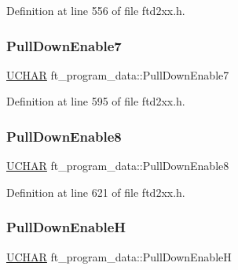Definition at line 556 of file ftd2xx.\+h.

\mbox{\label{structft__program__data_a54302ec0f17b20394a99db0bfdac50fd}} 
\subsubsection{\texorpdfstring{Pull\+Down\+Enable7}{PullDownEnable7}}
{\footnotesize\ttfamily \hyperlink{CatCaloProto40MHz_2inc_2WinTypes_8h_a4f4bb67531a9bf6f0b9c6ad76aeba587}{U\+C\+H\+AR} ft\+\_\+program\+\_\+data\+::\+Pull\+Down\+Enable7}



Definition at line 595 of file ftd2xx.\+h.

\mbox{\label{structft__program__data_a54a83cacd2ba6f2963d3b71716c1023e}} 
\subsubsection{\texorpdfstring{Pull\+Down\+Enable8}{PullDownEnable8}}
{\footnotesize\ttfamily \hyperlink{CatCaloProto40MHz_2inc_2WinTypes_8h_a4f4bb67531a9bf6f0b9c6ad76aeba587}{U\+C\+H\+AR} ft\+\_\+program\+\_\+data\+::\+Pull\+Down\+Enable8}



Definition at line 621 of file ftd2xx.\+h.

\mbox{\label{structft__program__data_af8a338b21c048bb0e585162bd491761e}} 
\subsubsection{\texorpdfstring{Pull\+Down\+EnableH}{PullDownEnableH}}
{\footnotesize\ttfamily \hyperlink{CatCaloProto40MHz_2inc_2WinTypes_8h_a4f4bb67531a9bf6f0b9c6ad76aeba587}{U\+C\+H\+AR} ft\+\_\+program\+\_\+data\+::\+Pull\+Down\+EnableH}



